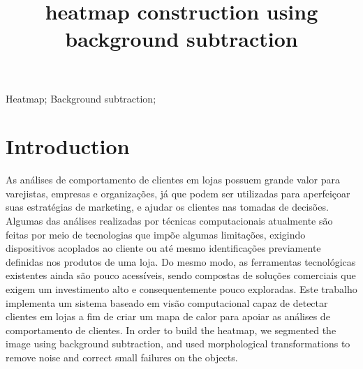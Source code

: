 \documentclass[10pt, conference]{IEEEtran}
\begin{document}
\title{heatmap construction using background subtraction}

\newif\iffinal
\finaltrue
\newcommand{\jemsid}{99999}
\iffinal
	\author{%
	    \and
	}
\else
  \author{Sibgrapi paper ID: \jemsid \\ }
\fi

\maketitle

\begin{abstract}
\end{abstract}

\begin{IEEEkeywords}
Heatmap; Background subtraction;

\end{IEEEkeywords}


\IEEEpeerreviewmaketitle


\section{Introduction}
As análises de comportamento de clientes em lojas possuem grande valor para varejistas, empresas e organizações, já que podem ser utilizadas para aperfeiçoar suas estratégias de marketing, e ajudar os clientes nas tomadas de decisões. Algumas das análises realizadas por técnicas computacionais atualmente são feitas por meio de tecnologias que impõe algumas limitações, exigindo dispositivos acoplados ao cliente ou até mesmo identificações previamente definidas nos produtos de uma loja. Do mesmo modo, as ferramentas tecnológicas existentes ainda são pouco acessíveis, sendo compostas de soluções comerciais que exigem um investimento alto e consequentemente pouco exploradas.
Este trabalho implementa um sistema baseado em visão computacional capaz de detectar clientes em lojas a fim de criar um mapa de calor para apoiar as análises de comportamento de clientes. In order to build the heatmap, we segmented the image using background subtraction, and used morphological transformations to remove noise and correct small failures on the objects.
\end{document}
